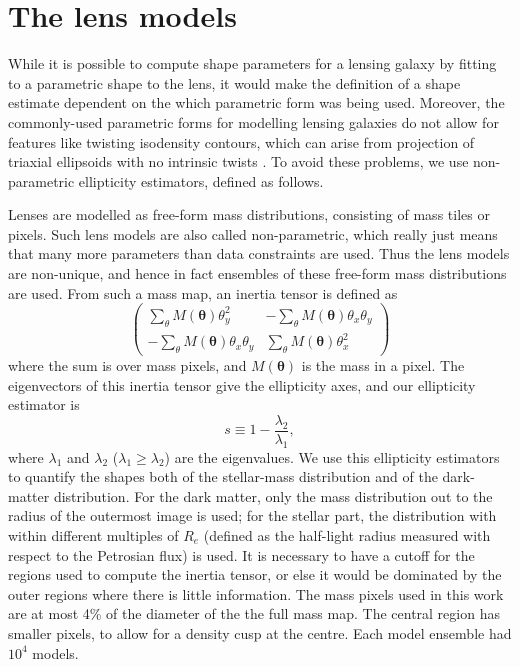 \documentclass[useAMS,usenatbib]{mn2e}
\begin{document}
\section{The lens models}\label{sec:shapemethod}

While it is possible to compute shape parameters for a lensing galaxy by fitting to a parametric shape to the lens, it would make the definition of a shape estimate dependent on the which parametric form was being used. Moreover, the commonly-used parametric forms for modelling lensing galaxies \citep[see e.g.,][]{2001astro.ph..2341K} do not allow for features like twisting isodensity contours, which can arise from projection of triaxial ellipsoids with no intrinsic twists \citep[e.g.][and references therein]{1978ComAp...8...27B}. To avoid these problems, we use non-parametric ellipticity estimators, defined as follows.

Lenses are modelled as free-form mass distributions, consisting of mass tiles or pixels. Such lens models are also called non-parametric, which really just means that many more parameters than data constraints are used. Thus the lens models are non-unique, and hence in fact ensembles of these free-form mass distributions are used. From such a mass map, an inertia tensor is defined as
\begin{equation}\label{eq:inertiatensor}
\begin{pmatrix}
 \sum_\theta M(\boldsymbol{\theta})\theta^{2}_{y} & -\sum_\theta M(\boldsymbol{\theta})\theta_{x}\theta_{y} \\
-\sum_\theta M(\boldsymbol{\theta})\theta_{x}\theta_{y} & \sum_\theta M(\boldsymbol{\theta})\theta^{2}_{x}
\end{pmatrix}
\end{equation}
where the sum is over mass pixels, and $M(\boldsymbol{\theta})$ is the mass in a pixel. The eigenvectors of this inertia tensor give the ellipticity axes, and our ellipticity estimator is
\begin{equation}\label{eq:shapeestimate}
    s \equiv 1 - \frac{\lambda_{2}}{\lambda_{1}},
\end{equation}
where $\lambda_{1}$ and $\lambda_{2}$ ($\lambda_{1} \geq \lambda_{2}$) are the eigenvalues. We use this ellipticity estimators to quantify the shapes both of the stellar-mass distribution and of the dark-matter distribution. For the dark matter, only the mass distribution out to the radius of the outermost image is used; for the stellar part, the distribution with within different multiples of $R_e$ (defined as the half-light radius measured with respect to the Petrosian flux) is used. It is necessary to have a cutoff for the regions used to compute the inertia tensor, or else it would be dominated by the outer regions where there is little information. The mass pixels used in this work are at most 4\% of the diameter of the the full mass map. The central region has smaller pixels, to allow for a density cusp at the centre. Each model ensemble had $10^4$ models.
\end{document}
